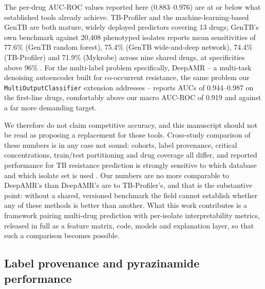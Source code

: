 The per-drug AUC-ROC values reported here (0.883--0.976) are at or below what established tools already achieve. TB-Profiler \cite{phelan2019tbprofiler} and the machine-learning-based GenTB \cite{groschel2021gentb} are both mature, widely deployed predictors covering 13 drugs; GenTB's own benchmark against 20{,}408 phenotyped isolates reports mean sensitivities of 77.6\% (GenTB random forest), 75.4\% (GenTB wide-and-deep network), 74.4\% (TB-Profiler) and 71.9\% (Mykrobe) across nine shared drugs, at specificities above 96\% \cite{groschel2021gentb}. For the multi-label problem specifically, DeepAMR \cite{yang2019deepamr} -- a multi-task denoising autoencoder built for co-occurrent resistance, the same problem our \texttt{MultiOutputClassifier} extension addresses -- reports AUCs of 0.944--0.987 on the first-line drugs, comfortably above our macro AUC-ROC of 0.919 and against a far more demanding target.

We therefore do not claim competitive accuracy, and this manuscript should not be read as proposing a replacement for those tools. Cross-study comparison of these numbers is in any case not sound: cohorts, label provenance, critical concentrations, train/test partitioning and drug coverage all differ, and reported performance for TB resistance prediction is strongly sensitive to which database and which isolate set is used \cite{ngo2019benchmarking}. Our numbers are no more comparable to DeepAMR's than DeepAMR's are to TB-Profiler's, and that is the substantive point: without a shared, versioned benchmark the field cannot establish whether any of these methods is better than another. What this work contributes is a framework pairing multi-drug prediction with per-isolate interpretability metrics, released in full as a feature matrix, code, models and explanation layer, so that such a comparison becomes possible.

\subsection{Label provenance and pyrazinamide performance}

